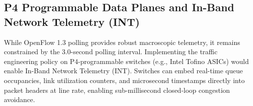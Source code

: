\documentclass[12pt,a4paper,oneside]{report}
\begin{document}
\subsection{P4 Programmable Data Planes and In-Band Network Telemetry (INT)}
While OpenFlow 1.3 polling provides robust macroscopic telemetry, it remains constrained by the 3.0-second polling interval. Implementing the traffic engineering policy on P4-programmable switches (e.g., Intel Tofino ASICs) would enable In-Band Network Telemetry (INT). Switches can embed real-time queue occupancies, link utilization counters, and microsecond timestamps directly into packet headers at line rate, enabling sub-millisecond closed-loop congestion avoidance.





\end{document}
